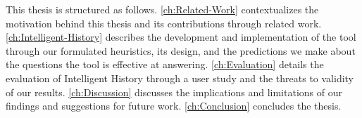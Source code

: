 This thesis is structured as follows. 
\autoref{ch:Related-Work} contextualizes the motivation behind this thesis and its contributions through related work. 
\autoref{ch:Intelligent-History} describes the development and implementation of the tool through our formulated heuristics, 
its design, and the predictions we make about the questions the tool is effective at answering. 
\autoref{ch:Evaluation} details the evaluation of Intelligent History through a user study and the threats to validity of our results.
\autoref{ch:Discussion} discusses the implications and limitations of our findings and suggestions for future work.
\autoref{ch:Conclusion} concludes the thesis.

\endinput

Any text after an \endinput is ignored.
You could put scraps here or things in progress.
